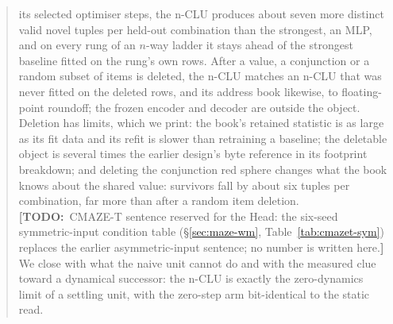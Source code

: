 \documentclass{article} %
\newcommand{\TODO}[1]{{\color{orange}\textbf{[TODO:}~#1\textbf{]}}}
\begin{document}
\begin{abstract}
its selected optimiser steps, the n-CLU produces about seven more distinct
valid novel tuples per held-out combination than the strongest, an MLP, and on every rung of an $n$-way ladder
it stays ahead of the strongest baseline fitted on the rung's own rows.
After a value, a conjunction or a random subset of items is deleted, the n-CLU matches an n-CLU that
was never fitted on the deleted rows, and its address book likewise, to floating-point roundoff; the frozen encoder and decoder are outside the
object. Deletion has limits, which we print: the book's retained statistic is %
as large as its fit data and its refit is slower than retraining a baseline; the deletable object is several times %
the earlier design's byte reference in its footprint breakdown; and deleting the conjunction red sphere %
changes what the book knows about the shared value: survivors fall by about six tuples per %
combination, far more than after a random item deletion. %
\TODO{CMAZE-T sentence reserved for the Head: the six-seed symmetric-input condition table
(\S\ref{sec:maze-wm}, Table~\ref{tab:cmazet-sym}) replaces the earlier asymmetric-input sentence; no
number is written here.}
We close with what the naive unit cannot do and with the measured clue toward a
dynamical successor: the n-CLU is exactly the zero-dynamics limit of a settling unit, with
the zero-step arm bit-identical to the static read. %
\end{abstract}
\end{document}
